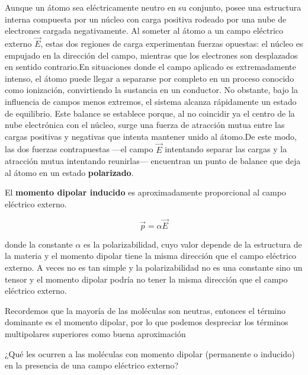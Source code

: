 \documentclass[12pt,a4paper]{report}
\newcommand{\esp}{\vspace{0.5cm}}
\begin{document}
	\esp
	
	Aunque un átomo sea eléctricamente neutro en su conjunto, posee una estructura interna compuesta por un núcleo con carga positiva rodeado por una nube de electrones cargada negativamente. Al someter al átomo a un campo eléctrico externo $\vec{E}$, estas dos regiones de carga experimentan fuerzas opuestas: el núcleo es empujado en la dirección del campo, mientras que los electrones son desplazados en sentido contrario.En situaciones donde el campo aplicado es extremadamente intenso, el átomo puede llegar a separarse por completo en un proceso conocido como ionización, convirtiendo la sustancia en un conductor. No obstante, bajo la influencia de campos menos extremos, el sistema alcanza rápidamente un estado de equilibrio. Este balance se establece porque, al no coincidir ya el centro de la nube electrónica con el núcleo, surge una fuerza de atracción mutua entre las cargas positivas y negativas que intenta mantener unido al átomo.De este modo, las dos fuerzas contrapuestas —el campo $\vec{E}$ intentando separar las cargas y la atracción mutua intentando reunirlas— encuentran un punto de balance que deja al átomo en un estado \textbf{polarizado}.

	\esp
	
	El \textbf{momento dipolar inducido} es aproximadamente proporcional al campo eléctrico externo.
	
	\begin{equation}
		\vec{p}=\alpha \vec{E}
	\end{equation}

	\esp
	
	donde la constante $\alpha$ es la polarizabilidad, cuyo valor depende de la estructura de la materia y el momento dipolar tiene la misma dirección que el campo eléctrico externo. A veces no es tan simple y la polarizabilidad no es una constante sino un tensor y el momento dipolar podría no tener la misma dirección que el campo eléctrico externo.

	\begin{importante}
		Recordemos que la mayoría de las moléculas son neutras, entonces el término dominante es el momento dipolar, por lo que podemos despreciar los términos multipolares superiores como buena aproximación
	\end{importante}

	\esp
	
	¿Qué les ocurren a las moléculas con momento dipolar (permanente o inducido) en la presencia de una campo eléctrico externo? 
	
\end{document}
